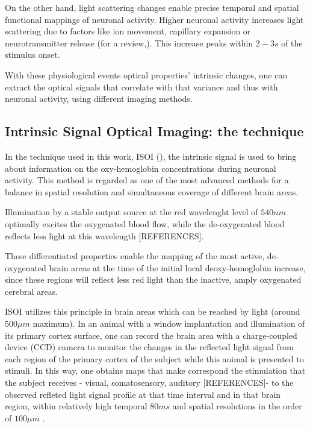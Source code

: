 On the other hand, light scattering changes enable precise temporal and spatial functional mappings of neuronal activity. Higher neuronal activity increases light scattering due to factors like ion movement, capillary expansion or neurotransmitter release (for a review,\cite{Cohen1973}). This increase peaks within $2-3 s$ of the stimulus onset.

With these physiological events optical properties' intrinsic changes, one can extract the optical signals that correlate with that variance and thus with neuronal activity, using different imaging methods.


\subsection{Intrinsic Signal Optical Imaging: the technique}

In the technique used in this work, ISOI (\cite{Grinvald1986}), the intrinsic signal is used to bring about information on the oxy-hemoglobin concentrations during neuronal activity. This method is regarded as one of the most advanced methods for a balance in spatial resolution and simultaneous coverage of different brain areas.

Illumination by a stable output source at the red wavelenght level of $540 nm$ optimally excites the oxygenated blood flow, while the de-oxygenated blood reflects less light at this wavelength [REFERENCES]. 

These differentiated properties enable the mapping of the most active, de-oxygenated brain areas at the time of the initial local deoxy-hemoglobin increase, since these regions will reflect less red light than the inactive, amply oxygenated cerebral areas.

ISOI utilizes this principle in brain areas which can be reached by light (around $500 \mu m$ maximum). In an animal with a window implantation and illumination of its primary cortex surface, one can record the brain area with a charge-coupled device (CCD) camera to monitor the changes in the reflected light signal from each region of the primary cortex of the subject while this animal is presented to stimuli. In this way, one obtains maps that make correspond the stimulation that the subject receives - visual, somatosensory, auditory [REFERENCES]- to the observed refleted light signal profile at that time interval and in that brain region, within relatively high temporal $80 ms$ \cite{Lu2017} and spatial resolutions in the order of $100 \mu m$ \cite{Grinvald1986}.

